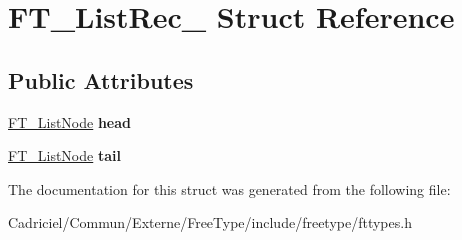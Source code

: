 \hypertarget{struct_f_t___list_rec__}{}\section{F\+T\+\_\+\+List\+Rec\+\_\+ Struct Reference}
\label{struct_f_t___list_rec__}
\subsection*{Public Attributes}
\begin{DoxyCompactItemize}
\item 
\hyperlink{struct_f_t___list_node_rec__}{F\+T\+\_\+\+List\+Node} {\bfseries head}\hypertarget{struct_f_t___list_rec___a09ed35c2bcdc1c3acd12ff4650dfdeb9}{}\label{struct_f_t___list_rec___a09ed35c2bcdc1c3acd12ff4650dfdeb9}

\item 
\hyperlink{struct_f_t___list_node_rec__}{F\+T\+\_\+\+List\+Node} {\bfseries tail}\hypertarget{struct_f_t___list_rec___a4664761f0ab2af3d48231b00cd978b23}{}\label{struct_f_t___list_rec___a4664761f0ab2af3d48231b00cd978b23}

\end{DoxyCompactItemize}


The documentation for this struct was generated from the following file\+:\begin{DoxyCompactItemize}
\item 
Cadriciel/\+Commun/\+Externe/\+Free\+Type/include/freetype/fttypes.\+h\end{DoxyCompactItemize}
